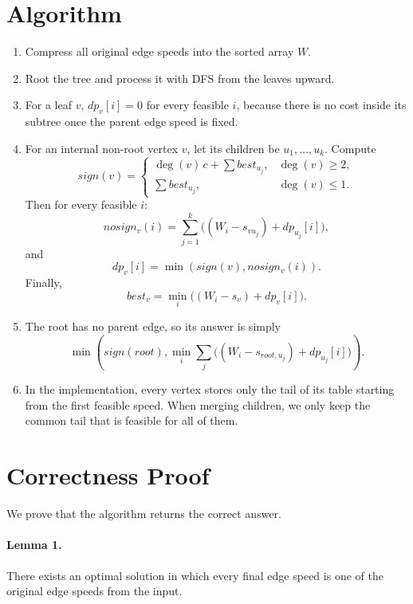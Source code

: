 \documentclass[11pt]{article}
\begin{document}
\section*{Algorithm}

\begin{enumerate}[leftmargin=*]
    \item Compress all original edge speeds into the sorted array $W$.
    \item Root the tree and process it with DFS from the leaves upward.
    \item For a leaf $v$, $dp_v[i] = 0$ for every feasible $i$, because there is no cost inside its subtree once the
    parent edge speed is fixed.
    \item For an internal non-root vertex $v$, let its children be $u_1,\dots,u_k$.
    Compute
    \[
        sign(v) =
        \begin{cases}
            \deg(v)\,c + \sum best_{u_j}, & \deg(v) \ge 2, \\
            \sum best_{u_j}, & \deg(v) \le 1.
        \end{cases}
    \]
    Then for every feasible $i$:
    \[
        nosign_v(i) = \sum_{j=1}^{k} \bigl((W_i - s_{vu_j}) + dp_{u_j}[i]\bigr),
    \]
    and
    \[
        dp_v[i] = \min(sign(v), nosign_v(i)).
    \]
    Finally,
    \[
        best_v = \min_i \bigl((W_i - s_v) + dp_v[i]\bigr).
    \]
    \item The root has no parent edge, so its answer is simply
    \[
        \min\left(sign(root), \min_i \sum_j \bigl((W_i - s_{root,u_j}) + dp_{u_j}[i]\bigr)\right).
    \]
    \item In the implementation, every vertex stores only the tail of its table starting from the first feasible speed.
    When merging children, we only keep the common tail that is feasible for all of them.
\end{enumerate}

\section*{Correctness Proof}

We prove that the algorithm returns the correct answer.

\paragraph{Lemma 1.}
There exists an optimal solution in which every final edge speed is one of the original edge speeds from the input.
\end{document}
